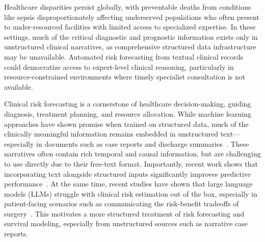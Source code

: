 Healthcare disparities persist globally, with preventable deaths from conditions like sepsis disproportionately affecting underserved populations who often present to under-resourced facilities with limited access to specialized expertise. In these settings, much of the critical diagnostic and prognostic information exists only in unstructured clinical narratives, as comprehensive structured data infrastructure may be unavailable. Automated risk forecasting from textual clinical records could democratize access to expert-level clinical reasoning, particularly in resource-constrained environments where timely specialist consultation is not available.

Clinical risk forecasting is a cornerstone of healthcare decision-making, guiding diagnosis, treatment planning, and resource allocation. While machine learning approaches have shown promise when trained on structured data, much of the clinically meaningful information remains embedded in unstructured text—especially in documents such as case reports and discharge summaries~\citep{seinen2025using}.
These narratives often contain rich temporal and causal information, but are challenging to use directly due to their free-text format. Importantly, recent work shows that incorporating text alongside structured inputs significantly improves predictive performance~\citep{kline2022multimodal}.
At the same time, recent studies have shown that large language models (LLMs) struggle with clinical risk estimation out of the box, especially in patient-facing scenarios such as communicating the risk-benefit tradeoffs of surgery~\citep{wongposition}. 
This motivates a more structured treatment of risk forecasting and survival modeling, especially from unstructured sources such as narrative case reports.

